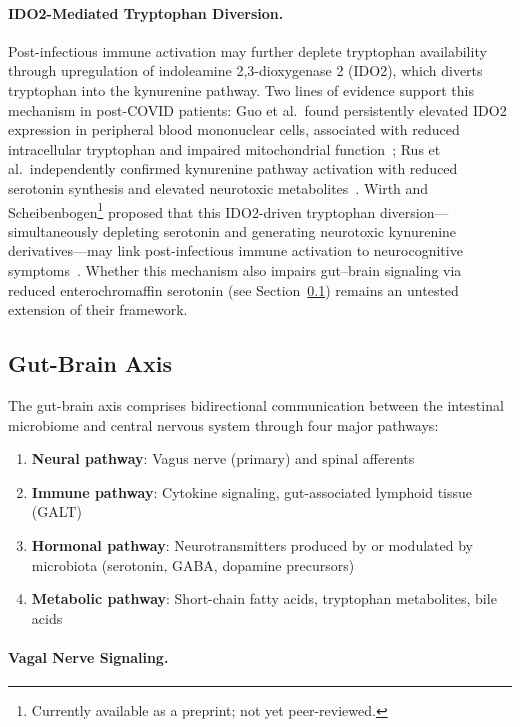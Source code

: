 \paragraph{IDO2-Mediated Tryptophan Diversion.}

Post-infectious immune activation may further deplete tryptophan availability through upregulation of indoleamine 2,3-dioxygenase 2 (IDO2), which diverts tryptophan into the kynurenine pathway. Two lines of evidence support this mechanism in post-COVID patients: Guo et al.\ found persistently elevated IDO2 expression in peripheral blood mononuclear cells, associated with reduced intracellular tryptophan and impaired mitochondrial function~\cite{Guo2023kynurenine}; Rus et al.\ independently confirmed kynurenine pathway activation with reduced serotonin synthesis and elevated neurotoxic metabolites~\cite{Rus2025}. Wirth and Scheibenbogen\footnote{Currently available as a preprint; not yet peer-reviewed.} proposed that this IDO2-driven tryptophan diversion---simultaneously depleting serotonin and generating neurotoxic kynurenine derivatives---may link post-infectious immune activation to neurocognitive symptoms~\cite{WirthScheibenbogen2025Neurotransmitter}. Whether this mechanism also impairs gut--brain signaling via reduced enterochromaffin serotonin (see Section~\ref{sec:gut-brain}) remains an untested extension of their framework.

\subsection{Gut-Brain Axis}
\label{sec:gut-brain}

The gut-brain axis comprises bidirectional communication between the intestinal microbiome and central nervous system through four major pathways:

\begin{enumerate}
    \item \textbf{Neural pathway}: Vagus nerve (primary) and spinal afferents
    \item \textbf{Immune pathway}: Cytokine signaling, gut-associated lymphoid tissue (GALT)
    \item \textbf{Hormonal pathway}: Neurotransmitters produced by or modulated by microbiota (serotonin, GABA, dopamine precursors)
    \item \textbf{Metabolic pathway}: Short-chain fatty acids, tryptophan metabolites, bile acids
\end{enumerate}

\paragraph{Vagal Nerve Signaling.}

